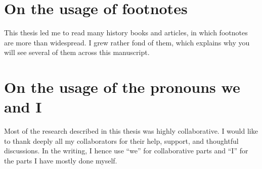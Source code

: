 \newpage

\section*{On the usage of footnotes}

This thesis led me to read many history books and articles, in which footnotes are more than widespread. I grew rather fond of them, which explains why you will see several of them across this manuscript.


\section*{On the usage of the pronouns we and I}

Most of the research described in this thesis was highly collaborative.
I would like to thank deeply all my collaborators for their help, support, and thoughtful discussions.
In the writing, I hence use ``we'' for collaborative parts and ``I'' for the parts I have mostly done myself.






















